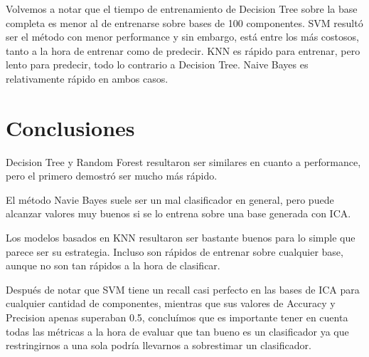 \documentclass[10pt, a4paper]{article}
\begin{document}
Volvemos a notar que el tiempo de entrenamiento de Decision Tree sobre la base completa es menor al de entrenarse sobre bases de 100 componentes. SVM resultó ser el método con menor performance y sin embargo, está entre los más costosos, tanto a la hora de entrenar como de predecir. KNN es rápido para entrenar, pero lento para predecir, todo lo contrario a Decision Tree. Naive Bayes es relativamente rápido en ambos casos.

\section{Conclusiones}

Decision Tree y Random Forest resultaron ser similares en cuanto a performance, pero el primero demostró ser mucho más rápido.

El método Navie Bayes suele ser un mal clasificador en general, pero puede alcanzar valores muy buenos si se lo entrena sobre una base generada con ICA.

Los modelos basados en KNN resultaron ser bastante buenos para lo simple que parece ser su estrategia. Incluso son rápidos de entrenar sobre cualquier base, aunque no son tan rápidos a la hora de clasificar.

Después de notar que SVM tiene un recall casi perfecto en las bases de ICA para cualquier cantidad de componentes,
mientras que sus valores de Accuracy y Precision apenas superaban 0.5, concluímos que es importante tener en cuenta todas las métricas a 
la hora de evaluar que tan bueno es un clasificador ya que restringirnos a una sola podría llevarnos a sobrestimar un clasificador.
\end{document}
